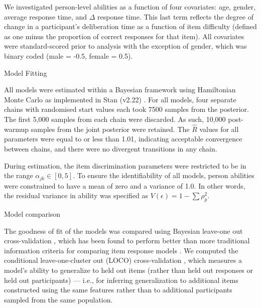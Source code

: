 \documentclass[a4paper,man,natbib]{apa6}
\makeatletter
\renewcommand{\subsubsection}{\@startsection{subsubsection}{3}
  {\z@}%
  {\b@level@two@skip}{\e@level@two@skip}%
  {\normalfont\normalsize\bfseries}}
\makeatother
\begin{document}
We investigated person-level abilities as a function of four covariates: age, gender, average response time, and $\Delta$ response time. This last term reflects the degree of change in a participant's deliberation time as a function of item difficulty (defined as one minus the proportion of correct responses for that item). All covariates were standard-scored prior to analysis with the exception of gender, which was binary coded (male = -0.5, female = 0.5).

\subsubsection{Model Fitting}

All models were estimated within a Bayesian framework using Hamiltonian Monte Carlo as implemented in Stan (v2.22) \citep{carpenter2017stan}. For all models, four separate chains with randomised start values each took 7500 samples from the posterior. The first 5,000 samples from each chain were discarded. As such, 10,000 post-warmup samples from the joint posterior were retained. The $\hat{R}$ values for all parameters were equal to or less than 1.01, indicating acceptable convergence between chains, and there were no divergent transitions in any chain. 

During estimation, the item discrimination parameters were restricted to be in the range $\alpha_{jk} \in [0, 5]$. To ensure the identifiability of all models, person abilities were constrained to have a mean of zero and a variance of 1.0. In other words, the residual variance in ability was specified as $V(\epsilon) = 1 - \sum \rho_p^2$.

\subsubsection{Model comparison}

The goodness of fit of the models was compared using Bayesian leave-one out cross-validation \citep{vehtari2017practical}, which has been found to perform better than more traditional information criteria for comparing item response models \citep{luo2017performances}. We computed the conditional leave-one-cluster out (LOCO) cross-validation \citep{merkle2019bayesian}, which measures a model's ability to generalize to held out items (rather than held out responses or held out participants) --- i.e., for inferring generalization to additional items constructed using the same features rather than to additional participants sampled from the same population.
\end{document}
